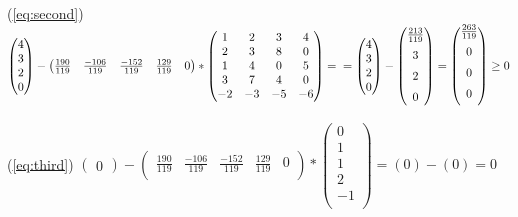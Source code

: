\documentclass[../body.tex]{subfiles}
\begin{document}
	(\ref{eq:second})
	$\begin{pmatrix}
		4\\ 3\\  2\\  0\\   
	\end{pmatrix} -
	\begin{pmatrix}	
		\frac{190}{119} & \frac{-106}{119} & \frac{-152}{119} & \frac{129}{119}  & 0\\
	\end{pmatrix} *  
		\begin{pmatrix} 
		1 & 2 & 3 & 4  \\
		2 & 3 & 8 & 0  \\
		1 & 4 & 0 & 5  \\
		3 & 7 & 4 & 0  \\
		-2 & -3 & -5 & -6  \\
		\end{pmatrix} =\\=
	\begin{pmatrix}
		4\\ 3\\  2\\  0\\  
	\end{pmatrix} -
	\begin{pmatrix}
		\frac{213}{119}\\[0.2cm] 3\\[0.2cm]  2\\[0.2cm]  0\\   
	\end{pmatrix} = 
	\begin{pmatrix}
	\frac{263}{119}\\[0.2cm] 0\\[0.2cm]  0\\[0.2cm]  0\\[0.2cm]   
	\end{pmatrix} \ge 0
	 $
	 \checkmark\\
	\vspace{\baselineskip}
	
	(\ref{eq:third}) 
	$\begin{pmatrix}
		0  
	\end{pmatrix} -
	\begin{pmatrix}	
		\frac{190}{119} & \frac{-106}{119} & \frac{-152}{119} & \frac{129}{119}  & 0\\
	\end{pmatrix} *  
	\begin{pmatrix} 
	0\\1\\1\\2\\-1\\
	\end{pmatrix} =(0)-(0)=0  $
	\checkmark\\
	\vspace{\baselineskip}
	
\end{document}
